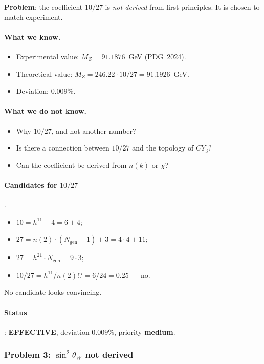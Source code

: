 \documentclass[11pt,a4paper]{article}
\newcommand{\CY}{\ensuremath{CY_3}}
\theoremstyle{definition}
\begin{document}
\medskip\noindent
\textbf{Problem}: the coefficient $10/27$ is \emph{not derived}
from first principles. It is chosen to match experiment.

\paragraph{What we know.}
\begin{itemize}
    \item Experimental value:
          $M_Z = 91.1876$~GeV (PDG~2024).
    \item Theoretical value:
          $M_Z = 246.22 \cdot 10/27 = 91.1926$~GeV.
    \item Deviation: $0.009\%$.
\end{itemize}

\paragraph{What we do not know.}
\begin{itemize}
    \item Why $10/27$, and not another number?
    \item Is there a connection between $10/27$ and the topology of $\CY$?
    \item Can the coefficient be derived from $n(k)$ or
          $\chi$?
\end{itemize}

\paragraph{Candidates for \texorpdfstring{$10/27$}{10/27}}.
\begin{itemize}
    \item $10 = h^{11} + 4 = 6 + 4$;
    \item $27 = n(2) \cdot (N_{\text{gen}} + 1) + 3 = 4 \cdot 4 + 11$;
    \item $27 = h^{21} \cdot N_{\text{gen}} = 9 \cdot 3$;
    \item $10/27 = h^{11}/n(2)!? = 6/24 = 0.25$ --- no.
\end{itemize}
No candidate looks convincing.

\paragraph{Status}: \textbf{EFFECTIVE}, deviation $0.009\%$,
priority \textbf{medium}.

\subsubsection{Problem 3: \texorpdfstring{$\sin^2\theta_W$}{\textasciicircum 2\_W} not derived}
\end{document}
